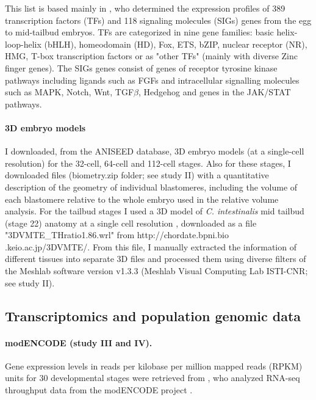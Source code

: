 This list is based mainly in \citet{Imai2004}, who determined the expression profiles of 389 transcription factors (TFs) and 118 signaling molecules (SIGs) genes from the egg to mid-tailbud embryos. TFs are categorized in nine gene families: basic helix-loop-helix (bHLH), homeodomain (HD), Fox, ETS, bZIP, nuclear receptor (NR), HMG, T-box transcription factors or as "other TFs" (mainly with diverse Zinc finger genes).
The SIGs genes consist of genes of receptor tyrosine kinase pathways including ligands such as FGFs and intracellular signalling molecules such as MAPK, Notch, Wnt, TGF$\beta$, Hedgehog and genes in the JAK/STAT pathways. 

\paragraph{3D embryo models}

I downloaded, from the ANISEED database, 3D embryo models (at a single-cell resolution) for the 32-cell, 64-cell and 112-cell stages. Also for these stages, I downloaded files (biometry.zip folder; see study II) with a quantitative description of the geometry of individual blastomeres, including the volume of each blastomere relative to the whole embryo \citep{Tassy2006} used in the relative volume analysis.
For the tailbud stages I used a 3D model of \textit{C. intestinalis} mid tailbud (stage 22) anatomy at a single cell resolution \citep{Nakamura2012}, downloaded as a file "3DVMTE\_THratio1.86.wrl" from http://chordate.bpni.bio .keio.ac.jp/3DVMTE/.
From this file, I manually extracted the information of different tissues into separate 3D files and processed them using diverse filters of the Meshlab software version v1.3.3 (Meshlab Visual Computing Lab ISTI-CNR; see study II).


\subsection{Transcriptomics and population genomic data}

\paragraph{modENCODE (study III and IV).}

Gene expression levels in reads per kilobase per million mapped reads (RPKM) units for 30 developmental stages were retrieved from \citet{Gelbart2013}, who analyzed RNA-seq throughput data from the modENCODE project \citep{Graveley2011}.

